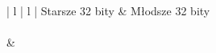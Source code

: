 \begin{center}
\begin{tabular}{ | l | l | }
\hline
	Starsze 32 bity & Młodsze 32 bity \\
\hline
{} \\
\hline
{} &  \\
\hline
\end{tabular}
\end{center}

